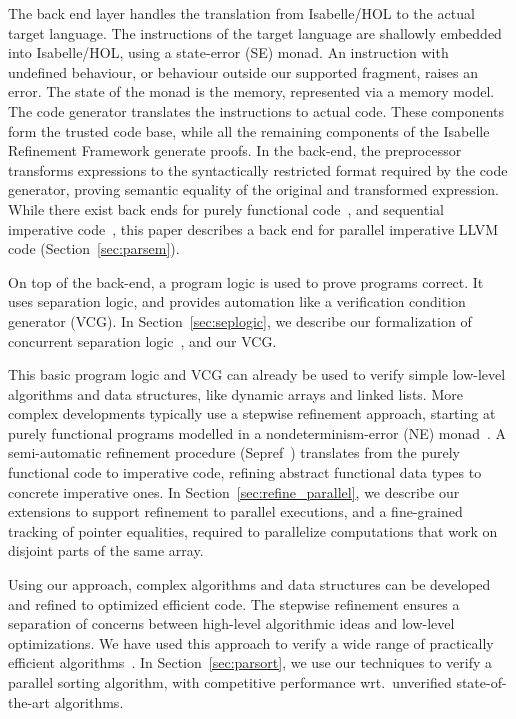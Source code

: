 \documentclass[a4paper,UKenglish,cleveref, autoref, thm-restate]{lipics-v2021}
\begin{document}
The back end layer handles the translation from Isabelle/HOL to the actual target language.
The instructions of the target language are shallowly embedded into Isabelle/HOL, using
a state-error (SE) monad. An instruction with undefined behaviour,
or behaviour outside our supported fragment, raises an error.
The state of the monad is the memory, represented via a memory model.
The code generator translates the instructions to actual code.
These components form the trusted code base, while all the remaining components of the
Isabelle Refinement Framework generate proofs. In the back-end, the preprocessor transforms
expressions to the syntactically restricted format required by the code generator,
proving semantic equality of the original and transformed expression.
While there exist back ends for purely functional code~\cite{LaTu12,La13},
and sequential imperative code~\cite{La15,La19-llvm}, this paper describes a back end
for parallel imperative LLVM code (Section~\ref{sec:parsem}).

On top of the back-end, a program logic is used to prove programs correct.
It uses separation logic, and provides automation like a verification condition generator (VCG).
In Section~\ref{sec:seplogic}, we describe our formalization of concurrent separation logic~\cite{OH04}, and our VCG.

This basic program logic and VCG can already be used to verify simple low-level algorithms and data structures,
like dynamic arrays and linked lists. More complex developments typically use a stepwise refinement approach,
starting at purely functional programs modelled in a nondeterminism-error (NE) monad~\cite{LaTu12}.
A semi-automatic refinement procedure (Sepref~\cite{La15,La19-llvm}) translates from the purely functional
code to imperative code, refining abstract functional data types to concrete imperative ones.
In Section~\ref{sec:refine_parallel}, we describe our extensions to support refinement to parallel executions,
and a fine-grained tracking of pointer equalities, required to parallelize computations that work on
disjoint parts of the same array.

Using our approach, complex algorithms and data structures can be developed and
refined to optimized efficient code. The stepwise refinement ensures a separation of concerns
between high-level algorithmic ideas and low-level optimizations. We have used this approach to
verify a wide range of practically efficient algorithms~\cite{ELNN13,BrLa18,WiLa18,La17_CADE,La17_SAT,FBL18,La14,LaSe16,LaSe19,La20}.
In Section~\ref{sec:parsort}, we use our techniques to verify a parallel sorting algorithm,
with competitive performance wrt.\ unverified state-of-the-art algorithms.
\end{document}
